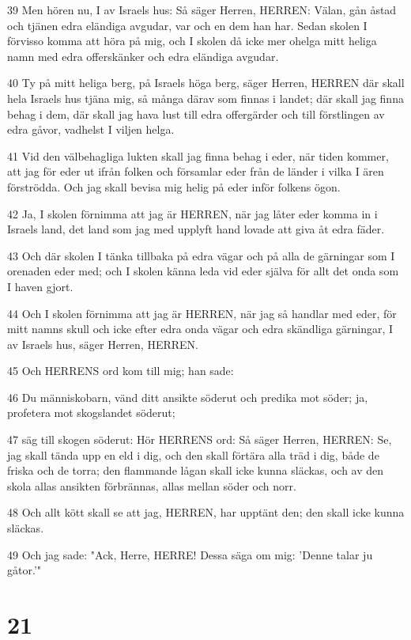 \par 39 Men hören nu, I av Israels hus: Så säger Herren, HERREN: Välan, gån åstad och tjänen edra eländiga avgudar, var och en dem han har. Sedan skolen I förvisso komma att höra på mig, och I skolen då icke mer ohelga mitt heliga namn med edra offerskänker och edra eländiga avgudar.
\par 40 Ty på mitt heliga berg, på Israels höga berg, säger Herren, HERREN där skall hela Israels hus tjäna mig, så många därav som finnas i landet; där skall jag finna behag i dem, där skall jag hava lust till edra offergärder och till förstlingen av edra gåvor, vadhelst I viljen helga.
\par 41 Vid den välbehagliga lukten skall jag finna behag i eder, när tiden kommer, att jag för eder ut ifrån folken och församlar eder från de länder i vilka I ären förströdda. Och jag skall bevisa mig helig på eder inför folkens ögon.
\par 42 Ja, I skolen förnimma att jag är HERREN, när jag låter eder komma in i Israels land, det land som jag med upplyft hand lovade att giva åt edra fäder.
\par 43 Och där skolen I tänka tillbaka på edra vägar och på alla de gärningar som I orenaden eder med; och I skolen känna leda vid eder själva för allt det onda som I haven gjort.
\par 44 Och I skolen förnimma att jag är HERREN, när jag så handlar med eder, för mitt namns skull och icke efter edra onda vägar och edra skändliga gärningar, I av Israels hus, säger Herren, HERREN.
\par 45 Och HERRENS ord kom till mig; han sade:
\par 46 Du människobarn, vänd ditt ansikte söderut och predika mot söder; ja, profetera mot skogslandet söderut;
\par 47 säg till skogen söderut: Hör HERRENS ord: Så säger Herren, HERREN: Se, jag skall tända upp en eld i dig, och den skall förtära alla träd i dig, både de friska och de torra; den flammande lågan skall icke kunna släckas, och av den skola allas ansikten förbrännas, allas mellan söder och norr.
\par 48 Och allt kött skall se att jag, HERREN, har upptänt den; den skall icke kunna släckas.
\par 49 Och jag sade: "Ack, Herre, HERRE! Dessa säga om mig: 'Denne talar ju gåtor.'"

\chapter{21}

